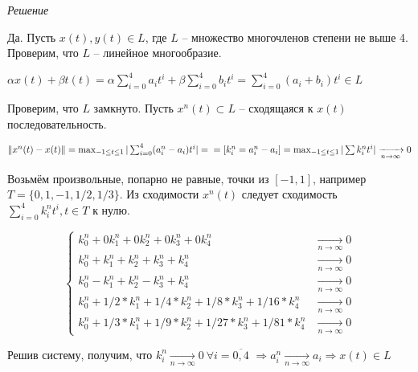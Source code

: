 \documentclass{article}
\begin{document}
\emph{Решение}

Да. Пусть $x(t), y(t) \in L $, где $L$ -- множество многочленов степени не выше 4.
Проверим, что $L$ -- линейное многообразие.

$\alpha x(t) + \beta t(t) = \alpha  \sum_{i = 0}^4 a_i t^i +  \beta \sum_{i = 0}^4 b_i t^i =  \sum_{i = 0}^4 (a_i + b_i) t^i \in L$

Проверим, что $L$ замкнуто. Пусть $x^n(t) \subset L$ -- сходящаяся к $x(t)$ последовательность.

$\| x^n(t) - x(t) \| = \max_{-1 \le t \le 1} | \sum_{i=0}^4 (a^n_i - a_i) t^i | = \\
= [k_i^n = a_i^n - a_i] = \max_{-1 \le t \le 1} |\sum k_i^n t^i| \xrightarrow[n \to \infty]{} 0$

Возьмём произвольные, попарно не равные, точки из $[-1, 1]$, например $T = \{0, 1, -1, 1/2, 1/3\}$.
 Из сходимости $x^n(t)$ следует сходимость $\sum_{i = 0}^4 k_i^n t^i, t\in T$ к нулю.

\[
\begin{cases}
	k_0^n + 0 k_1^n + 0 k_2^n + 0 k_3^n + 0 k_4^n & \xrightarrow[n \to \infty]{} 0\\
	k_0^n + k_1^n + k_2^n + k_3^n + k_4^n & \xrightarrow[n \to \infty]{} 0\\
	k_0^n - k_1^n + k_2^n - k_3^n + k_4^n & \xrightarrow[n \to \infty]{} 0\\
	k_0^n + 1/2*k_1^n + 1/4*k_2^n + 1/8*k_3^n + 1/16*k_4^n & \xrightarrow[n \to \infty]{} 0\\
	k_0^n + 1/3*k_1^n + 1/9*k_2^n + 1/27*k_3^n + 1/81*k_4^n & \xrightarrow[n \to \infty]{} 0
\end{cases}
\]

Решив систему, получим, что $k_i^n \xrightarrow[n \to \infty]{} 0 \  \forall i = \overline{0, 4}$ $\Rightarrow a_i^n \xrightarrow[n \to \infty]{} a_i \Rightarrow  x(t) \in L$
\end{document}
